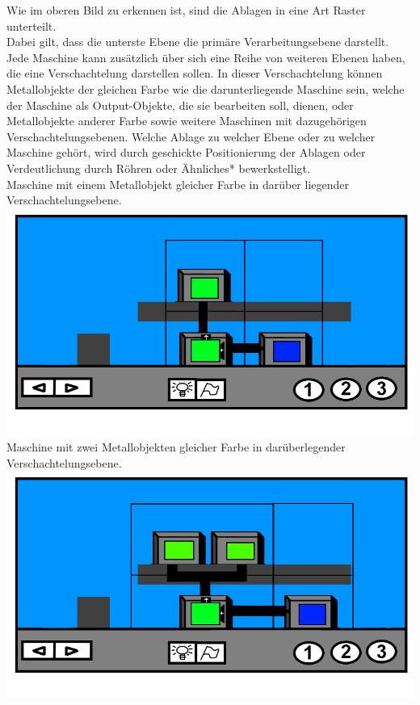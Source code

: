 \documentclass{scrartcl}
\begin{document}
\begin{description}
		\begin{minipage}{1\textwidth}
			Wie im oberen Bild zu erkennen ist, sind die Ablagen in eine Art Raster unterteilt.\\
			Dabei gilt, dass die unterste Ebene die primäre Verarbeitungsebene darstellt. Jede Maschine kann zusätzlich über sich eine Reihe von weiteren Ebenen haben, die eine Verschachtelung darstellen sollen. In dieser Verschachtelung können Metallobjekte der gleichen Farbe wie die darunterliegende Maschine sein, welche der Maschine als Output-Objekte, die sie bearbeiten soll, dienen, oder Metallobjekte anderer Farbe sowie weitere Maschinen mit dazugehörigen Verschachtelungsebenen. Welche Ablage zu welcher Ebene oder zu welcher Maschine gehört, wird durch geschickte Positionierung der Ablagen oder Verdeutlichung durch Röhren oder Ähnliches* bewerkstelligt.\\
			Maschine mit einem Metallobjekt gleicher Farbe in darüber liegender Verschachtelungsebene.\\ 
			\includegraphics[scale=0.5]{assets/LevelVerarbeitungBsp}\\
			Maschine mit zwei Metallobjekten gleicher Farbe in darüberlegender Verschachtelungsebene.\\
			\includegraphics[scale=0.5]{assets/LevelBsp2Out}\\
		\end{minipage}
		

\end{description}
\end{document}

